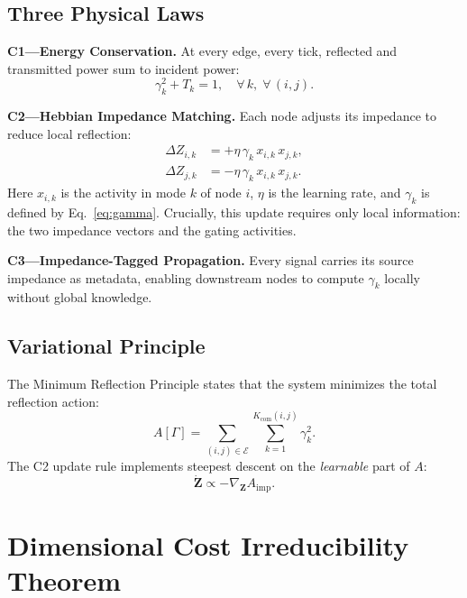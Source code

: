 \documentclass[aps,pre,twocolumn,superscriptaddress,floatfix]{revtex4-2}
\newcommand{\Aimp}{A_{\text{imp}}}
\newcommand{\Kcom}{K_{\text{com}}}
\begin{document}
\subsection{Three Physical Laws}
\label{sec:laws}

\textbf{C1---Energy Conservation.}
At every edge, every tick, reflected and transmitted power sum to
incident power:
\begin{equation}
\gamma_k^2 + T_k = 1, \quad \forall\, k, \; \forall\, (i,j).
\label{eq:C1}
\end{equation}

\textbf{C2---Hebbian Impedance Matching.}
Each node adjusts its impedance to reduce local reflection:
\begin{align}
\Delta Z_{i,k} &= +\eta \, \gamma_k \, x_{i,k}\, x_{j,k},
\label{eq:C2a} \\
\Delta Z_{j,k} &= -\eta \, \gamma_k \, x_{i,k}\, x_{j,k}.
\label{eq:C2b}
\end{align}
Here $x_{i,k}$ is the activity in mode $k$ of node $i$,
$\eta$ is the learning rate, and $\gamma_k$ is defined by
Eq.~\eqref{eq:gamma}.
Crucially, this update requires only local information:
the two impedance vectors and the gating activities.

\textbf{C3---Impedance-Tagged Propagation.}
Every signal carries its source impedance as metadata,
enabling downstream nodes to compute $\gamma_k$ locally without
global knowledge.

\subsection{Variational Principle}
\label{sec:action}

The Minimum Reflection Principle states that the system minimizes
the total reflection action:
\begin{equation}
A[\Gamma]
= \sum_{(i,j) \in \mathcal{E}}
  \sum_{k=1}^{\Kcom(i,j)} \gamma_k^2.
\label{eq:action}
\end{equation}
The C2 update rule implements steepest descent on the \emph{learnable}
part of $A$:
\begin{equation}
\dot{\mathbf{Z}} \propto -\nabla_{\mathbf{Z}} \Aimp.
\end{equation}

\section{Dimensional Cost Irreducibility Theorem}
\label{sec:theorem}
\end{document}
